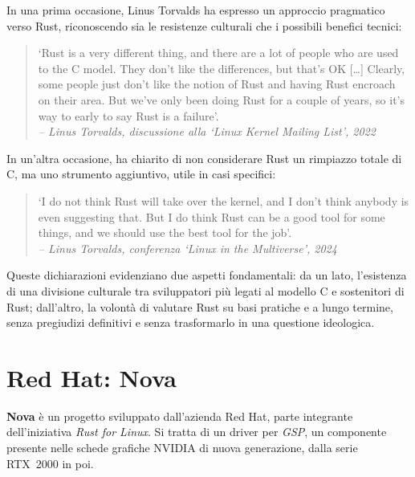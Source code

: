 In una prima occasione, Linus Torvalds ha espresso un approccio pragmatico verso Rust, riconoscendo sia le resistenze culturali che i possibili benefici tecnici:

\begin{quote}
`Rust is a very different thing, and there are a lot of people who are used to the C model. They don’t like the differences, but that’s OK [\ldots] 
Clearly, some people just don’t like the notion of Rust and having Rust encroach on their area. But we’ve only been doing Rust for a couple of 
years, so it’s way to early to say Rust is a failure'. \hfill \\
\emph{-- Linus Torvalds, discussione alla `Linux Kernel Mailing List', 2022}
\end{quote}

\noindent In un'altra occasione, ha chiarito di non considerare Rust un rimpiazzo totale di C, ma uno strumento aggiuntivo, utile in casi specifici:
\begin{quote}
`I do not think Rust will take over the kernel, and I don’t think anybody is even suggesting that. But 
I do think Rust can be a good tool for some things, and we should use the best tool for the job'. \hfill \\
\emph{-- Linus Torvalds, conferenza `Linux in the Multiverse', 2024}
\end{quote}

\noindent Queste dichiarazioni evidenziano due aspetti fondamentali: da un lato, l'esistenza di una divisione culturale tra sviluppatori più legati al modello C e
sostenitori di Rust; dall'altro, la volontà di valutare Rust su basi pratiche e a lungo termine, senza pregiudizi definitivi e senza trasformarlo in una questione ideologica.

\section{Red Hat: Nova}\label{sec:redhat-nova}
\textbf{Nova} è un progetto sviluppato dall'azienda Red Hat, parte integrante dell'iniziativa \textit{Rust for Linux}. Si tratta di un driver per \textit{GSP}, un componente 
presente nelle schede grafiche NVIDIA di nuova generazione, dalla serie RTX~2000 in poi.

